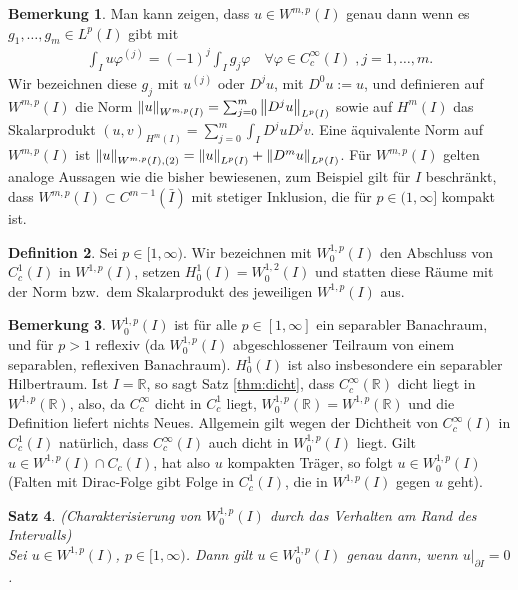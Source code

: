 \documentclass[twoside]{article}
\newcounter{lecnum}
\newtheorem{theorem}{Satz}[lecnum]
\theoremstyle{definition}
\newtheorem{remark}[theorem]{Bemerkung}
\newtheorem{definition}[theorem]{Definition}
\begin{document}
\begin{remark}
Man kann zeigen, dass $u \in W^{m,p}(I)$ genau dann wenn es $g_1, \dots , g_m \in L^p(I)$ gibt mit
\begin{align*}
\int_I u \varphi^{(j)} = (-1)^j \int_I g_j \varphi \quad \forall \varphi \in C_c^\infty(I) \; , j = 1 , \dots , m .
\end{align*}
Wir bezeichnen diese $g_j$ mit $u^{(j)}$ oder $D^j u$, mit $D^0 u := u$, und definieren auf $W^{m,p}(I)$ die Norm $\norm{u}_{W^{m,p}(I)}=\sum_{j=0}^m \norm{D^j u}_{L^p(I)}$ sowie auf $H^m(I)$ das Skalarprodukt $(u,v)_{H^m(I)} = \sum_{j=0}^m \int_I D^j u D^j v$. Eine äquivalente Norm auf $W^{m,p}(I)$ ist $\norm{u}_{W^{m,p}(I),(2)}=\norm{u}_{L^p(I)} + \norm{D^m u}_{L^p(I)}$. Für $W^{m,p}(I)$ gelten analoge Aussagen wie die bisher bewiesenen, zum Beispiel gilt für $I$ beschränkt, dass $W^{m,p}(I) \subset C^{m-1}(\bar{I})$ mit stetiger Inklusion, die für $p \in (1,\infty]$ kompakt ist.
\end{remark}
\begin{definition}
Sei $p \in [1,\infty)$. Wir bezeichnen mit $W^{1,p}_0(I)$ den Abschluss von $C_c^1(I)$ in $W^{1,p}(I)$, setzen $H_0^1(I) = W^{1,2}_0(I)$ und statten diese Räume mit der Norm bzw.\ dem Skalarprodukt des jeweiligen $W^{1,p}(I)$ aus.
\end{definition}
\begin{remark}
$W^{1,p}_0(I)$ ist für alle $p \in [1,\infty]$ ein separabler Banachraum, und für $p>1$ reflexiv (da $W^{1,p}_0(I)$ abgeschlossener Teilraum von einem separablen, reflexiven Banachraum). $H_0^1(I)$ ist also insbesondere ein separabler Hilbertraum. Ist $I = \mathbb{R}$, so sagt Satz \ref{thm:dicht}, dass $C_c^\infty(\mathbb{R})$ dicht liegt in $W^{1,p}(\mathbb{R})$, also, da $C_c^\infty$ dicht in $C_c^1$ liegt, $W_0^{1,p}(\mathbb{R}) = W^{1,p}(\mathbb{R})$ und die Definition liefert nichts Neues. Allgemein gilt wegen der Dichtheit von $C_c^\infty(I)$ in $C_c^1(I)$ natürlich, dass $C_c^\infty(I)$ auch dicht in $W_0^{1,p}(I)$ liegt. Gilt $u \in W^{1,p}(I) \cap C_c(I)$, hat also $u$ kompakten Träger, so folgt $u \in W^{1,p}_0(I)$ (Falten mit Dirac-Folge gibt Folge in $C_c^1(I)$, die in $W^{1,p}(I)$ gegen $u$ geht).
\end{remark}
\begin{theorem} (Charakterisierung von $W^{1,p}_0(I)$ durch das Verhalten am Rand des Intervalls) \label{thm:w1p0}\\
Sei $u \in W^{1,p}(I)$, $p \in [1,\infty)$. Dann gilt $u \in W^{1,p}_0(I)$ genau dann, wenn $u|_{\partial I} = 0$.
\end{theorem}
\end{document}
